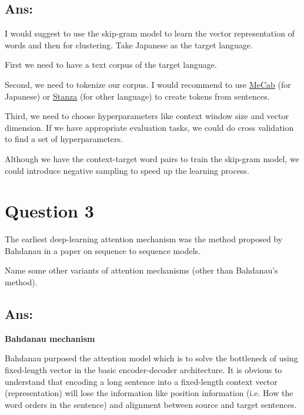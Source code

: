 \documentclass{kthreport}
\begin{document}
\subsection{Ans:}
I would suggest to use the skip-gram model \cite{mikolov2013distributed}
to learn the vector representation of words and then for clustering.
Take Japanese as the target language.

First we need to have a text corpus of the target language.

Second, we need to tokenize our corpus. I would recommend to use
\href{https://taku910.github.io/mecab/}{MeCab} (for Japanese)
or \href{https://stanfordnlp.github.io/stanza/}{Stanza} (for other language)
to create tokens from sentences.

Third, we need to choose hyperparameters like context window size and vector dimension.
If we have appropriate evaluation tasks, we could do cross validation to find
a set of hyperparameters.

Although we have the context-target word pairs to train the skip-gram model, we
could introduce negative sampling to speed up the learning process. \cite{mikolov2013distributed}



\section{Question 3}
The earliest deep-learning attention mechanism was the method proposed by Bahdanau
in a paper on sequence to sequence models.

Name some other variants of attention mechanisms (other than Bahdanau's method).

\subsection*{Ans:}

\textbf{Bahdanau mechanism}


Bahdanau purposed the attention model which is to solve the bottleneck of using
fixed-length vector in the basic encoder-decoder architecture. It is obvious to understand
that encoding a long sentence into a fixed-length context vector (representation)
will lose the information like position information (i.e. How the word orders in the sentence)
and alignment between source and target sentences.
\end{document}
